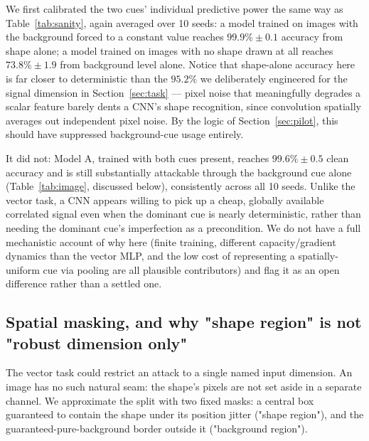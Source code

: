 \documentclass[11pt]{article}
\begin{document}
We first calibrated the two cues' individual predictive power the same way
as Table~\ref{tab:sanity}, again averaged over 10 seeds: a model trained on
images with the background forced to a constant value reaches
$99.9\%\pm0.1$ accuracy from shape alone; a model trained on images with
no shape drawn at all reaches $73.8\%\pm1.9$ from background level alone.
Notice that shape-alone accuracy here is far closer to deterministic than
the $95.2\%$ we deliberately engineered for the signal dimension in
Section~\ref{sec:task} --- pixel noise that meaningfully degrades a scalar
feature barely dents a CNN's shape recognition, since convolution
spatially averages out independent pixel noise. By the logic of
Section~\ref{sec:pilot}, this should have suppressed background-cue usage
entirely.

It did not: Model A, trained with both cues present, reaches
$99.6\%\pm0.5$ clean accuracy and is still substantially attackable
through the background cue alone (Table~\ref{tab:image}, discussed
below), consistently across all 10 seeds. Unlike the vector task, a CNN
appears willing to pick up a cheap, globally available correlated signal
even when the dominant cue is nearly deterministic, rather than needing
the dominant cue's imperfection as a precondition. We do not have a full
mechanistic account of why here (finite training, different
capacity/gradient dynamics than the vector MLP, and the low cost of
representing a spatially-uniform cue via pooling are all plausible
contributors) and flag it as an open difference rather than a settled one.

\subsection{Spatial masking, and why "shape region" is not "robust dimension only"}

The vector task could restrict an attack to a single named input
dimension. An image has no such natural seam: the shape's pixels are not
set aside in a separate channel. We approximate the split with two fixed
masks: a central box guaranteed to contain the shape under its position
jitter ("shape region"), and the guaranteed-pure-background border outside
it ("background region").
\end{document}
